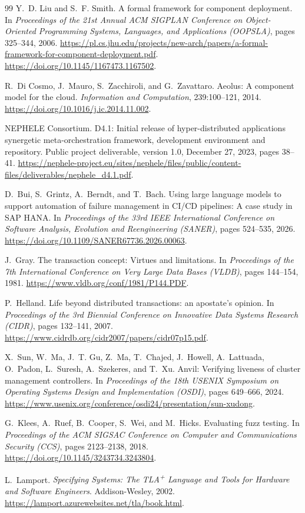 \begin{thebibliography}{99}
Y.~D. Liu and S.~F. Smith.
A formal framework for component deployment.
In \emph{Proceedings of the 21st Annual ACM SIGPLAN Conference on
Object-Oriented Programming Systems, Languages, and Applications (OOPSLA)},
pages 325--344, 2006.
\url{https://pl.cs.jhu.edu/projects/new-arch/papers/a-formal-framework-for-component-deployment.pdf}.
\url{https://doi.org/10.1145/1167473.1167502}.

R.~Di Cosmo, J.~Mauro, S.~Zacchiroli, and G.~Zavattaro.
Aeolus: A component model for the cloud.
\emph{Information and Computation}, 239:100--121, 2014.
\url{https://doi.org/10.1016/j.ic.2014.11.002}.

NEPHELE Consortium.
D4.1: Initial release of hyper-distributed applications synergetic
meta-orchestration framework, development environment and repository.
Public project deliverable, version 1.0, December 27, 2023, pages 38--41.
\url{https://nephele-project.eu/sites/nephele/files/public/content-files/deliverables/nephele_d4.1.pdf}.

D.~Bui, S.~Grintz, A.~Berndt, and T.~Bach.
Using large language models to support automation of failure management in
CI/CD pipelines: A case study in SAP HANA.
In \emph{Proceedings of the 33rd IEEE International Conference on Software
Analysis, Evolution and Reengineering (SANER)}, pages 524--535, 2026.
\url{https://doi.org/10.1109/SANER67736.2026.00063}.

J.~Gray.
The transaction concept: Virtues and limitations.
In \emph{Proceedings of the 7th International Conference on Very Large
Data Bases (VLDB)}, pages 144--154, 1981.
\url{https://www.vldb.org/conf/1981/P144.PDF}.

P.~Helland.
Life beyond distributed transactions: an apostate's opinion.
In \emph{Proceedings of the 3rd Biennial Conference on Innovative Data
Systems Research (CIDR)}, pages 132--141, 2007.
\url{https://www.cidrdb.org/cidr2007/papers/cidr07p15.pdf}.

X.~Sun, W.~Ma, J.~T. Gu, Z.~Ma, T.~Chajed, J.~Howell, A.~Lattuada,
O.~Padon, L.~Suresh, A.~Szekeres, and T.~Xu.
Anvil: Verifying liveness of cluster management controllers.
In \emph{Proceedings of the 18th USENIX Symposium on Operating Systems
Design and Implementation (OSDI)}, pages 649--666, 2024.
\url{https://www.usenix.org/conference/osdi24/presentation/sun-xudong}.

G.~Klees, A.~Ruef, B.~Cooper, S.~Wei, and M.~Hicks.
Evaluating fuzz testing.
In \emph{Proceedings of the ACM SIGSAC Conference on Computer and
Communications Security (CCS)}, pages 2123--2138, 2018.
\url{https://doi.org/10.1145/3243734.3243804}.

L.~Lamport.
\emph{Specifying Systems: The TLA\textsuperscript{+} Language and
Tools for Hardware and Software Engineers}.
Addison-Wesley, 2002.
\url{https://lamport.azurewebsites.net/tla/book.html}.

\end{thebibliography}
